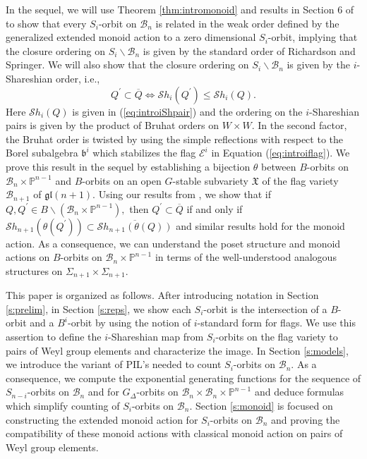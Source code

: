 \documentclass[12pt]{amsart}
\numberwithin{equation}{section}
\theoremstyle{remark}
\theoremstyle{definition}
\newcommand{\fb}{\mbox{${\mathfrak b}$}}
\newcommand{\fgl}{\mathfrak{gl}}
\newcommand{\B}{\mathcal{B}}
\newcommand{\Sh}{\mathcal{S}h}
\begin{document}
In the sequel, we will use Theorem \ref{thm:intromonoid} and results in Section 6 of \cite{CE21II} to show that every $S_{i}$-orbit on $\B_{n}$ is related in the weak order defined by the generalized extended monoid action to a zero dimensional $S_{i}$-orbit, implying that the closure ordering on $S_{i}\backslash \B_{n}$ is given by the standard order of Richardson and Springer. We will also show that 
the closure ordering on $S_{i}\backslash\B_{n}$ is given by the $i$-Shareshian order, i.e.,
\begin{equation}\label{eq:iShorder}
Q^{\prime}\subset \overline{Q}\Leftrightarrow \Sh_{i}(Q^{\prime})\leq \Sh_{i}(Q).
\end{equation}
Here $\Sh_{i}(Q)$ is given in (\ref{eq:introiShpair}) and the ordering on the $i$-Shareshian pairs is given by the product of Bruhat orders on $W\times W$.  In the second factor, the Bruhat order is twisted by using the simple reflections with respect to the Borel subalgebra $\fb^{i}$ which stabilizes the flag $\mathcal{E}^{i}$ in Equation (\ref{eq:introiflag}).  We prove this result in the sequel by establishing a bijection $\theta$ between $B$-orbits on $\B_n \times \mathbb{P}^{n-1}$  and $B$-orbits on an open $G$-stable subvariety $\mathfrak{X}$ of the flag variety $\B_{n+1}$ of $\fgl(n+1).$   Using our results from \cite{Shpairs}, we show that if $Q, Q^{\prime} \in B\backslash(\B_n \times \mathbb{P}^{n-1}),$ then $Q^{\prime} \subset \overline{Q}$ if and only if $\Sh_{n+1}(\theta(Q^{\prime})) \subset \overline{\Sh_{n+1}(\theta(Q))}$ and similar results hold for the monoid action.   As a consequence, we can understand the poset structure and monoid actions on $B$-orbits on $\B_n \times \mathbb{P}^{n-1}$ in terms of the well-understood analogous structures on $\Sigma_{n+1} \times \Sigma_{n+1}$.

This paper is organized as follows.  After introducing notation in Section \ref{s:prelim}, in Section \ref{s:reps}, we show each $S_i$-orbit is the intersection of a $B$-orbit and a $B^i$-orbit by using the notion of $i$-standard form for flags.  We use this assertion to define the $i$-Shareshian map from $S_i$-orbits on the flag variety to pairs of Weyl group elements and characterize the image.  In Section \ref{s:models}, we introduce the variant of PIL's needed to count $S_i$-orbits on $\B_n.$  As a consequence, we compute the exponential generating functions for the sequence of $S_{n-i}$-orbits on $\B_n$ and for $G_{\Delta}$-orbits on $\B_n \times \B_n \times \mathbb{P}^{n-1}$ and deduce formulas which simplify counting of $S_i$-orbits on $\B_n.$   Section \ref{s:monoid} is focused on constructing the extended monoid action for $S_{i}$-orbits on $\B_{n}$ and proving the compatibility of these monoid actions with classical monoid action on pairs of Weyl group elements. 
\end{document}
